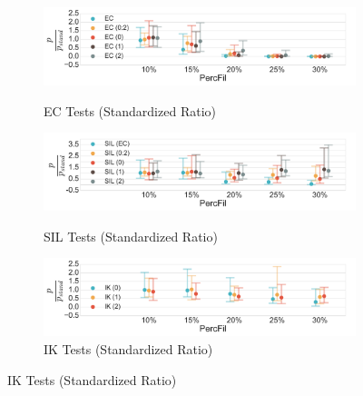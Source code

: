 \documentclass[12pt]{article}
\begin{document}
\begin{center}
  \begin{figure}[htp!]
    \centering
    \begin{subfigure}{.47\textwidth}
      \centering
      \caption{EC Tests (Standardized Ratio)}
      \includegraphics[height = .78in]{figure_8_joint_euler_group.pdf}
      \label{fig:sub_euler_normed}
    \end{subfigure}
    \begin{subfigure}{.47\textwidth}
      \centering
      \caption{SIL Tests (Standardized Ratio)}
      \includegraphics[height = .78in]{figure_8_joint_silhouette_group.pdf}
      \label{fig:sub_silh_normed_normed}
    \end{subfigure}
    \begin{subfigure}{.47\textwidth}
      \centering
      \caption{IK Tests (Standardized Ratio)}
      \includegraphics[height = .78in]{figure_8_joint_contour_group.pdf}

\end{subfigure}
\end{figure}
\end{center}
\end{document}
